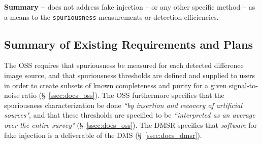 \documentclass[DM,lsstdraft,toc]{lsstdoc}
\begin{document}
{\bf Summary --}  does not address fake injection -- or any other specific method -- as a means to the {\tt spuriousness} measurements or detection efficiencies.





\subsection{Summary of Existing Requirements and Plans}\label{ssec:docs_sum}

The OSS requires that spuriousness be measured for each detected difference image source, and that spuriousness thresholds are defined and supplied to users in order to create subsets of known completeness and purity for a given signal-to-noise ratio (\S~\ref{ssec:docs_oss}). The OSS furthermore specifies that the spuriousness characterization be done {\it ``by insertion and recovery of artificial sources"}, and that these thresholds are specified to be {\it ``interpreted as an average over the entire survey"} (\S~\ref{ssec:docs_oss}). The DMSR specifies that {\it software} for fake injection is a deliverable of the DMS (\S~\ref{ssec:docs_dmsr}).
\end{document}
